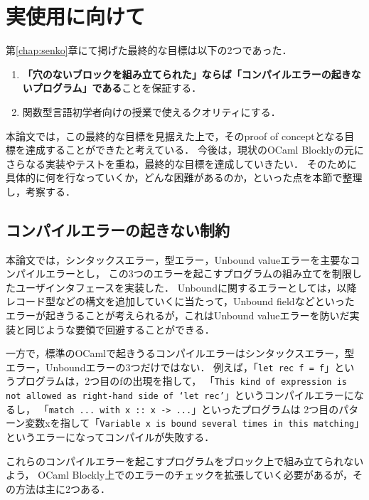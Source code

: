 \section {実使用に向けて}\label{sub:later}

第\ref{chap:senko}章にて掲げた最終的な目標は以下の2つであった．
\begin {enumerate}
  \item {\bf 「穴のないブロックを組み立てられた」ならば「コンパイルエラーの起きないプログラム」である}ことを保証する．
  \item 関数型言語初学者向けの授業で使えるクオリティにする．
\end {enumerate}

本論文では，この最終的な目標を見据えた上で，そのproof of conceptとなる目標を達成することができたと考えている．
今後は，現状のOCaml Blocklyの元にさらなる実装やテストを重ね，最終的な目標を達成していきたい．
そのために具体的に何を行なっていくか，どんな困難があるのか，といった点を本節で整理し，考察する．

\subsection*{コンパイルエラーの起きない制約}

本論文では，シンタックスエラー，型エラー，Unbound valueエラーを主要なコンパイルエラーとし，
この3つのエラーを起こすプログラムの組み立てを制限したユーザインタフェースを実装した．
Unboundに関するエラーとしては，以降レコード型などの構文を追加していくに当たって，Unbound fieldなどといったエラーが起きうることが考えられるが，これはUnbound valueエラーを防いだ実装と同じような要領で回避することができる．

一方で，標準のOCamlで起きうるコンパイルエラーはシンタックスエラー，型エラー，Unboundエラーの3つだけではない．
例えば，「{\tt let rec f = f}」というプログラムは，2つ目のfの出現を指して，
「{\tt This kind of expression is not allowed as right-hand side of `let rec'}」というコンパイルエラーになるし，
「{\tt match ... with x ::\ x -> ...}」といったプログラムは
2つ目のパターン変数xを指して「{\tt Variable x is bound several times in this matching}」というエラーになってコンパイルが失敗する．

これらのコンパイルエラーを起こすプログラムをブロック上で組み立てられないよう，
OCaml Blockly上でのエラーのチェックを拡張していく必要があるが，その方法は主に2つある．

